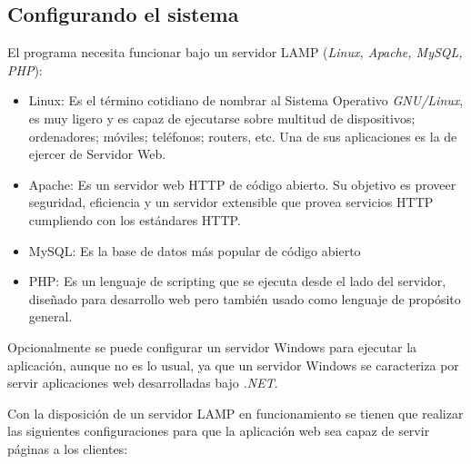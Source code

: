 \subsection{Configurando el sistema}

El programa necesita funcionar bajo un servidor LAMP (\emph{Linux, Apache, MySQL, PHP}):

    \begin{itemize}
        \item Linux: Es el término cotidiano de nombrar al Sistema Operativo \emph{GNU/Linux}, es muy ligero y es capaz de ejecutarse sobre multitud de dispositivos; ordenadores; móviles; teléfonos; routers, etc. Una de sus aplicaciones es la de ejercer de Servidor Web.
        \item Apache: Es un servidor web HTTP de código abierto. Su objetivo es proveer seguridad, eficiencia y un servidor extensible que provea servicios HTTP cumpliendo con los estándares HTTP.
        \item MySQL: Es la base de datos más popular de código abierto
        \item PHP: Es un lenguaje de scripting que se ejecuta desde el lado del servidor, diseñado para desarrollo web pero también usado como lenguaje de propósito general.
    \end{itemize}

Opcionalmente se puede configurar un servidor Windows para ejecutar la aplicación, aunque no es lo usual, ya que un servidor Windows se caracteriza por servir aplicaciones web desarrolladas bajo \emph{.NET}.

Con la disposición de un servidor LAMP en funcionamiento se tienen que realizar las siguientes configuraciones para que la aplicación web sea capaz de servir páginas a los clientes:

